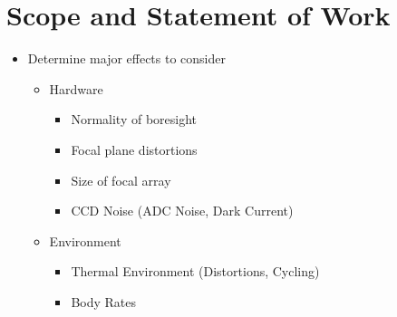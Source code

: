 \section{Scope and Statement of Work}
\begin{itemize}
    \item Determine major effects to consider
    \begin{itemize}
        \item Hardware
        \begin{itemize}
            \item Normality of boresight
            \item Focal plane distortions
            \item Size of focal array
            \item CCD Noise (ADC Noise, Dark Current)
        \end{itemize}
        
        \item Environment
        \begin{itemize}
            \item Thermal Environment (Distortions, Cycling)
            \item Body Rates
        \end{itemize}


\end{itemize}
\end{itemize}
